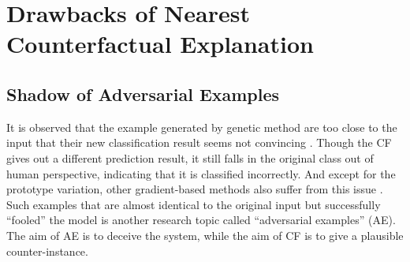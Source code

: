 \section{Drawbacks of Nearest Counterfactual Explanation}\label{sec:adversarial}
\subsection{Shadow of Adversarial Examples}
It is observed that the example generated by genetic method are too close to the input that their new classification result seems not convincing \cite{onePixel,certifai}. Though the CF gives out a different prediction result, it still falls in the original class out of human perspective, indicating that it is classified incorrectly. And except for the prototype variation, other gradient-based methods also suffer from this issue \cite{prototype}. Such examples that are almost identical to the original input but successfully ``fooled'' the model is another research topic called ``adversarial examples'' (AE). The aim of AE is to deceive the system, while the aim of CF is to give a plausible counter-instance.

